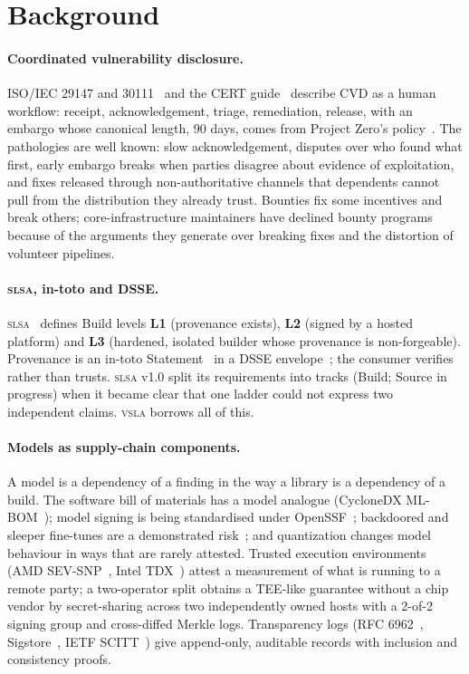 \documentclass[11pt]{article}
\newcommand{\vsla}{\textsc{vsla}}
\newcommand{\slsa}{\textsc{slsa}}
\newcommand{\lvl}[1]{\textbf{L#1}}
\begin{document}
\section{Background}

\paragraph{Coordinated vulnerability disclosure.}
ISO/IEC 29147 and 30111~\cite{iso29147,iso30111} and the CERT guide~\cite{certcvd} describe CVD as a human
workflow: receipt, acknowledgement, triage, remediation, release, with an embargo whose canonical length,
90 days, comes from Project Zero's policy~\cite{p0}. The pathologies are well known: slow acknowledgement,
disputes over who found what first, early embargo breaks when parties disagree about evidence of exploitation,
and fixes released through non-authoritative channels that dependents cannot pull from the distribution they
already trust. Bounties fix some incentives and break others; core-infrastructure maintainers have declined
bounty programs because of the arguments they generate over breaking fixes and the distortion of volunteer
pipelines.

\paragraph{\slsa{}, in-toto and DSSE.}
\slsa{}~\cite{slsa} defines Build levels \lvl{1} (provenance exists), \lvl{2} (signed by a hosted platform) and
\lvl{3} (hardened, isolated builder whose provenance is non-forgeable). Provenance is an in-toto
Statement~\cite{intoto} in a DSSE envelope~\cite{dsse}; the consumer verifies rather than trusts. \slsa{}
v1.0 split its requirements into tracks (Build; Source in progress) when it became clear that one ladder could
not express two independent claims. \vsla{} borrows all of this.

\paragraph{Models as supply-chain components.}
A model is a dependency of a finding in the way a library is a dependency of a build. The software bill of
materials has a model analogue (CycloneDX ML-BOM~\cite{cyclonedx}); model signing is being standardised
under OpenSSF~\cite{modelsigning}; backdoored and sleeper fine-tunes are a demonstrated risk~\cite{sleeper};
and quantization changes model behaviour in ways that are rarely attested. Trusted execution environments
(AMD SEV-SNP~\cite{sevsnp}, Intel TDX~\cite{tdx}) attest a measurement of what is running to a remote party;
a two-operator split obtains a TEE-like guarantee without a chip vendor by secret-sharing across two
independently owned hosts with a 2-of-2 signing group and cross-diffed Merkle logs. Transparency logs
(RFC 6962~\cite{rfc6962}, Sigstore~\cite{sigstore}, IETF SCITT~\cite{scitt}) give append-only, auditable
records with inclusion and consistency proofs.
\end{document}
